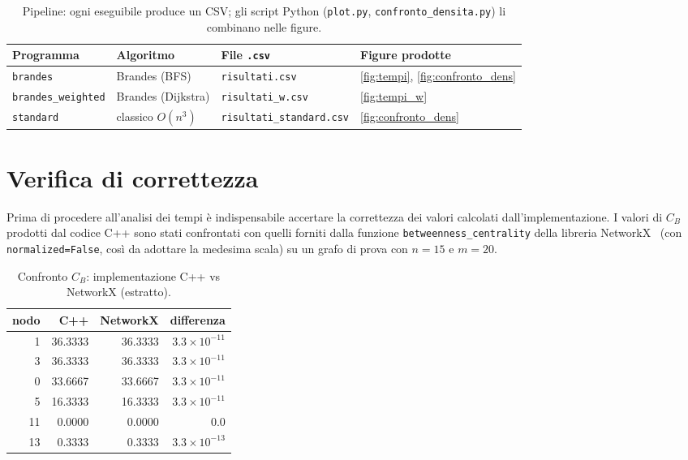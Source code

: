 \documentclass[11pt,a4paper]{report}
\begin{document}
\begin{table}[H]
	\centering
	\begin{tabular}{@{}llll@{}}
		\toprule
		Programma            & Algoritmo          & File \texttt{.csv}          & Figure prodotte \\
		\midrule
		\texttt{brandes}          & Brandes (BFS)      & \texttt{risultati.csv}          & \ref{fig:tempi}, \ref{fig:confronto_dens} \\
		\texttt{brandes\_weighted} & Brandes (Dijkstra) & \texttt{risultati\_w.csv}        & \ref{fig:tempi_w} \\
		\texttt{standard}         & classico $O(n^3)$  & \texttt{risultati\_standard.csv} & \ref{fig:confronto_dens} \\
		\bottomrule
	\end{tabular}
	\caption{Pipeline: ogni eseguibile produce un CSV; gli script Python
	(\texttt{plot.py}, \texttt{confronto\_densita.py}) li combinano nelle figure.}
	\label{tab:pipeline}
\end{table}

\section{Verifica di correttezza}

Prima di procedere all'analisi dei tempi è indispensabile accertare la
correttezza dei valori calcolati dall'implementazione. I valori di $C_B$ prodotti
dal codice C++ sono stati confrontati con quelli forniti dalla funzione
\texttt{betweenness\_centrality} della libreria NetworkX~\cite{networkx}
(con \texttt{normalized=False}, così da adottare la medesima scala) su un grafo di
prova con $n=15$ e $m=20$.

\begin{table}[H]
	\centering
	\caption{Confronto $C_B$: implementazione C++ vs NetworkX (estratto).}
	\begin{tabular}{rrrr}
		\toprule
		nodo & C++     & NetworkX & differenza          \\
		\midrule
		1    & 36.3333 & 36.3333  & $3.3\times10^{-11}$ \\
		3    & 36.3333 & 36.3333  & $3.3\times10^{-11}$ \\
		0    & 33.6667 & 33.6667  & $3.3\times10^{-11}$ \\
		5    & 16.3333 & 16.3333  & $3.3\times10^{-11}$ \\
		11   & 0.0000  & 0.0000   & $0.0$               \\
		13   & 0.3333  & 0.3333   & $3.3\times10^{-13}$ \\
		\bottomrule
	\end{tabular}
\end{table}
\end{document}
